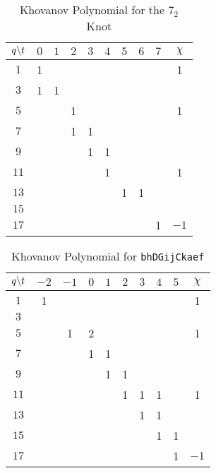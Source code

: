 \documentclass{article}
\theoremstyle{plain}
\begin{document}
        \begin{table}[H]
            \centering
            \begin{tabular}{| c | c | c | c | c | c | c | c | c | c |}
                \hline
                $q\symbol{92}t$&$0$&$1$&$2$&$3$&$4$&$5$&$6$&$7$&$\chi$\\
                \hline
                $1$&1&&&&&&&&1\\
                \hline
                $3$&1&1&&&&&&&\\
                \hline
                $5$&&&1&&&&&&1\\
                \hline
                $7$&&&1&1&&&&&\\
                \hline
                $9$&&&&1&1&&&&\\
                \hline
                $11$&&&&&1&&&&1\\
                \hline
                $13$&&&&&&1&1&&\\
                \hline
                $15$&&&&&&&&&\\
                \hline
                $17$&&&&&&&&1&$-1$\\
                \hline
            \end{tabular}
            \caption{Khovanov Polynomial for the $7_{2}$ Knot}
            \label{table:m_5_kho}
        \end{table}
        \begin{table}[H]
            \centering
            \begin{tabular}{| c | c | c | c | c | c | c | c | c | c |}
                \hline
                $q\symbol{92}t$&$-2$&$-1$&$0$&$1$&$2$&$3$&$4$&$5$&$\chi$\\
                \hline
                $1$&1&&&&&&&&1\\
                \hline
                $3$&&&&&&&&&\\
                \hline
                $5$&&1&2&&&&&&1\\
                \hline
                $7$&&&1&1&&&&&\\
                \hline
                $9$&&&&1&1&&&&\\
                \hline
                $11$&&&&&1&1&1&&1\\
                \hline
                $13$&&&&&&1&1&&\\
                \hline
                $15$&&&&&&&1&1&\\
                \hline
                $17$&&&&&&&&1&$-1$\\
                \hline
            \end{tabular}
            \caption{Khovanov Polynomial for \texttt{bhDGijCkaef}}
            \label{table:bhDGijCkaef_kho}
        \end{table}
\end{document}
